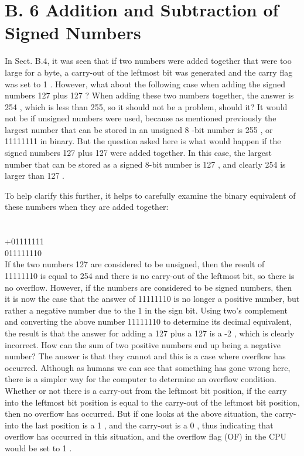 \documentclass[10pt]{book}
\begin{document}
\section{B. 6 Addition and Subtraction of Signed Numbers}
In Sect. B.4, it was seen that if two numbers were added together that were too large for a byte, a carry-out of the leftmost bit was generated and the carry flag was set to 1 . However, what about the following case when adding the signed numbers 127 plus 127 ? When adding these two numbers together, the answer is 254 , which is less than 255, so it should not be a problem, should it? It would not be if unsigned numbers were used, because as mentioned previously the largest number that can be stored in an unsigned 8 -bit number is 255 , or 11111111 in binary. But the question asked here is what would happen if the signed numbers 127 plus 127 were added together. In this case, the largest number that can be stored as a signed 8-bit number is 127 , and clearly 254 is larger than 127 .

To help clarify this further, it helps to carefully examine the binary equivalent of these numbers when they are added together:

\section{}
+01111111\\
011111110\\
If the two numbers 127 are considered to be unsigned, then the result of 11111110 is equal to 254 and there is no carry-out of the leftmost bit, so there is no overflow. However, if the numbers are considered to be signed numbers, then it is now the case that the answer of 11111110 is no longer a positive number, but rather a negative number due to the 1 in the sign bit. Using two's complement and converting the above number 11111110 to determine its decimal equivalent, the result is that the answer for adding a 127 plus a 127 is a -2 , which is clearly incorrect. How can the sum of two positive numbers end up being a negative number? The answer is that they cannot and this is a case where overflow has occurred. Although as humans we can see that something has gone wrong here, there is a simpler way for the computer to determine an overflow condition. Whether or not there is a carry-out from the leftmost bit position, if the carry into the leftmost bit position is equal to the carry-out of the leftmost bit position, then no overflow has occurred. But if one looks at the above situation, the carry-into the last position is a 1 , and the carry-out is a 0 , thus indicating that overflow has occurred in this situation, and the overflow flag (OF) in the CPU would be set to 1 .
\end{document}
